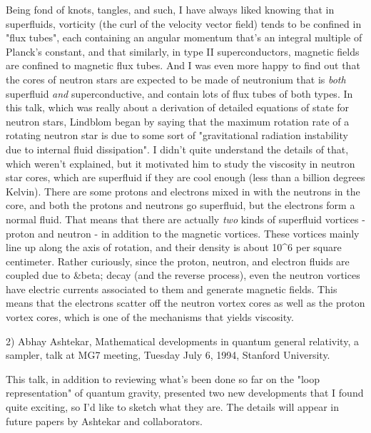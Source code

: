 Being fond of knots, tangles, and such, I have always liked
knowing that in superfluids, vorticity (the curl of the  velocity
vector field) tends to be confined in "flux tubes", each
containing an angular momentum that's an integral multiple of 
Planck's constant, and that similarly, in type II
superconductors, magnetic fields are confined to magnetic flux
tubes.  And I was even more happy to find out that the cores of 
neutron stars are expected to be made of neutronium that is
\emph{both} superfluid \emph{and} superconductive, and contain lots of flux
tubes of both types.  In this talk, which was really about a
derivation of detailed equations of state for neutron stars,
Lindblom began by saying that the maximum rotation rate of a
rotating neutron star is due to some sort of "gravitational
radiation instability due to internal fluid dissipation".  I
didn't quite understand the details of that, which weren't
explained, but it motivated him to study the viscosity in
neutron star cores, which are superfluid if they are cool enough
(less than a billion degrees Kelvin).  There are some protons and
electrons mixed in with the neutrons in the core, and both the
protons and neutrons go superfluid, but the electrons form a
normal fluid.  That means that there are actually \emph{two} kinds of
superfluid vortices - proton and neutron - in addition to the
magnetic vortices.   These vortices mainly line up along the axis
of rotation, and their density is about 10^6 per square
centimeter.  Rather curiously, since the proton, neutron, and
electron fluids are coupled due to &beta; decay (and the reverse
process), even the neutron vortices have electric currents
associated to them and generate magnetic fields.  This means that
the electrons scatter off the neutron vortex cores as well as the
proton vortex cores, which is one of the mechanisms that yields
viscosity.

2) Abhay Ashtekar, Mathematical developments in quantum general
relativity, a sampler, talk at MG7 meeting, Tuesday July 6, 1994,
Stanford University.

This talk, in addition to reviewing what's been done so far on 
the "loop representation" of quantum gravity, presented two new
developments that I found quite exciting, so I'd like to sketch
what they are.  The details will appear in future papers by
Ashtekar and collaborators.   

